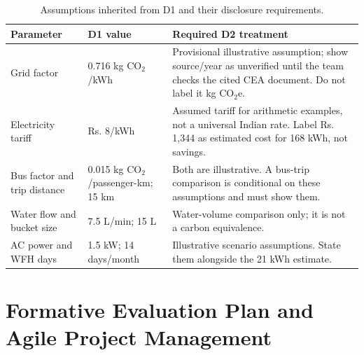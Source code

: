 \documentclass[12pt, a4paper]{article}
\begin{document}
\begin{table}[H]
\centering
\small
\begin{tabularx}{\textwidth}{@{}p{3.0cm}p{2.8cm}X@{}}
\toprule
\textbf{Parameter} & \textbf{D1 value} & \textbf{Required D2 treatment} \\
\midrule
Grid factor & 0.716 kg CO$_2$/kWh & Provisional illustrative assumption; show source/year as unverified until the team checks the cited CEA document. Do not label it kg CO$_2$e. \\
Electricity tariff & Rs. 8/kWh & Assumed tariff for arithmetic examples, not a universal Indian rate. Label Rs. 1,344 as estimated cost for 168 kWh, not savings. \\
Bus factor and trip distance & 0.015 kg CO$_2$/passenger-km; 15 km & Both are illustrative. A bus-trip comparison is conditional on these assumptions and must show them. \\
Water flow and bucket size & 7.5 L/min; 15 L & Water-volume comparison only; it is not a carbon equivalence. \\
AC power and WFH days & 1.5 kW; 14 days/month & Illustrative scenario assumptions. State them alongside the 21 kWh estimate. \\
\bottomrule
\end{tabularx}
\caption{Assumptions inherited from D1 and their disclosure requirements.}
\label{tab:assumptions}
\end{table}

\section{Formative Evaluation Plan and Agile Project Management}
\end{document}
